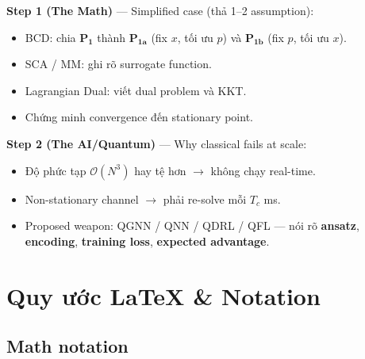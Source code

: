 \documentclass[11pt,a4paper]{article}
\begin{document}
\textbf{Step 1 (The Math)} --- Simplified case (thả 1--2 assumption):
\begin{itemize}
  \item BCD: chia $\mathbf{P_1}$ thành $\mathbf{P_{1a}}$ (fix $x$, tối ưu $p$) và $\mathbf{P_{1b}}$ (fix $p$, tối ưu $x$).
  \item SCA / MM: ghi rõ surrogate function.
  \item Lagrangian Dual: viết dual problem và KKT.
  \item Chứng minh convergence đến stationary point.
\end{itemize}

\textbf{Step 2 (The AI/Quantum)} --- Why classical fails at scale:
\begin{itemize}
  \item Độ phức tạp $\mathcal{O}(N^3)$ hay tệ hơn $\rightarrow$ không chạy real-time.
  \item Non-stationary channel $\rightarrow$ phải re-solve mỗi $T_c$ ms.
  \item Proposed weapon: QGNN / QNN / QDRL / QFL --- nói rõ \textbf{ansatz}, \textbf{encoding}, \textbf{training loss}, \textbf{expected advantage}.
\end{itemize}

\section{Quy ước LaTeX \& Notation}

\subsection{Math notation}
\end{document}
